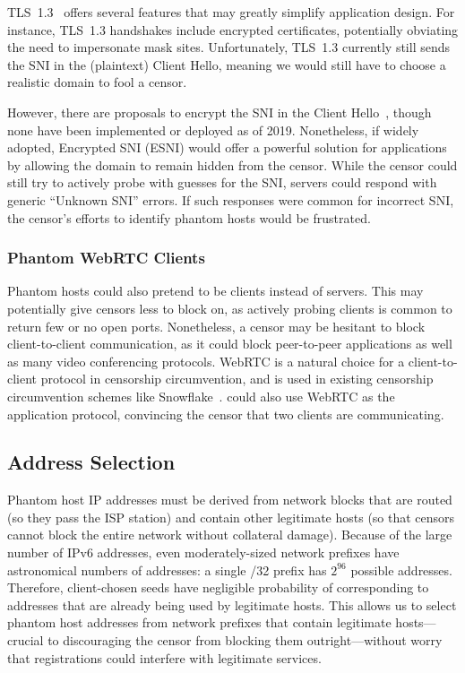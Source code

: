 \documentclass[sigconf,anonymous]{acmart}
\begin{document}
TLS~1.3~\cite{tls13} offers several features that may greatly simplify 
\scheme application design. For instance, TLS~1.3 handshakes include encrypted
certificates, potentially obviating the need to impersonate mask sites.
Unfortunately, TLS~1.3 currently still sends the SNI in the (plaintext) Client
Hello, meaning we would still have to choose a realistic domain to fool a
censor.

However, there are proposals to encrypt the SNI in the Client Hello~\cite{ietf-tls-esni-02},
though none have been implemented or deployed as of 2019. Nonetheless,
if widely adopted, Encrypted SNI (ESNI) would offer a powerful solution for
\scheme applications by allowing the domain to remain hidden from the censor.
While the censor could still try to actively probe with guesses for the SNI,
servers could respond with generic ``Unknown SNI'' errors. If such responses
were common for incorrect SNI, the censor's efforts to identify phantom hosts
would be frustrated.

\subsubsection{Phantom WebRTC Clients}
\label{sec:webrtc}

Phantom hosts could also pretend to be clients instead of servers. This may
potentially give censors less to block on, as actively probing clients is common
to return few or no open ports. Nonetheless, a censor may be hesitant to block
client-to-client communication, as it could block peer-to-peer applications as
well as many video conferencing protocols. WebRTC is a
natural choice for a client-to-client protocol in censorship circumvention,
and is used in existing censorship circumvention schemes like
Snowflake~\cite{snowflake}. \scheme could also use WebRTC as the
application protocol, convincing the censor that two clients are communicating.


\TabApplications

\subsection{Address Selection}
\label{sec:addr-selection}

Phantom host IP addresses must be derived from network blocks that are routed (so they pass
the ISP station) and contain other legitimate hosts (so that censors cannot
block the entire network without collateral damage).
Because of the large number of IPv6 addresses, even
moderately-sized network prefixes have astronomical numbers of addresses: a
single /32 prefix has $2^{96}$ possible addresses. Therefore, client-chosen
seeds have negligible probability of corresponding to addresses that are already
being used by legitimate hosts. This allows us to select phantom host addresses
from network prefixes that contain
legitimate hosts---crucial to discouraging the censor from blocking them
outright---without worry that registrations could interfere with legitimate
services.
\end{document}
